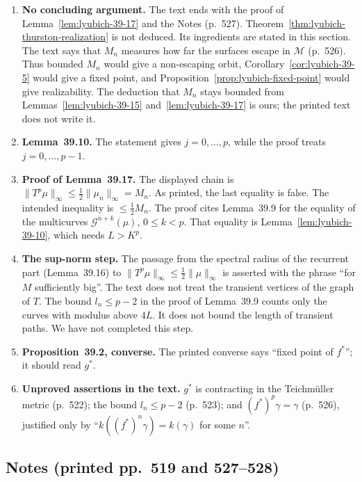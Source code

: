 \begin{enumerate}
\item \textbf{No concluding argument.}  The text ends with the proof of Lemma~\ref{lem:lyubich-39-17} and the
  Notes (p.~527).  Theorem~\ref{thm:lyubich-thurston-realization} is not deduced.  Its ingredients are stated
  in this section.  The text says that $M_n$ measures how far the surfaces escape in $\mathcal M$ (p.~526).  Thus
  bounded $M_n$ would give a non-escaping orbit, Corollary~\ref{cor:lyubich-39-5} would give a fixed point, and
  Proposition~\ref{prop:lyubich-fixed-point} would give realizability.  The deduction that $M_n$ stays bounded
  from Lemmas~\ref{lem:lyubich-39-15} and~\ref{lem:lyubich-39-17} is ours; the printed text does not write it.
\item \textbf{Lemma~39.10.}  The statement gives $j=0,\dots,p$, while the proof treats $j=0,\dots,p-1$.
\item \textbf{Proof of Lemma~39.17.}  The displayed chain is $\|T^p\mu\|_\infty\le\tfrac12\|\mu_n\|_\infty=M_n$.
  As printed, the last equality is false.  The intended inequality is $\le\tfrac12M_n$.  The proof cites
  Lemma~39.9 for the equality of the multicurves $\mathcal G^{n+k}(\mu)$, $0\le k<p$.  That equality is
  Lemma~\ref{lem:lyubich-39-10}, which needs $L>K^p$.
\item \textbf{The sup-norm step.}  The passage from the spectral radius of the recurrent part (Lemma~39.16) to
  $\|T^p\mu\|_\infty\le\tfrac12\|\mu\|_\infty$ is asserted with the phrase ``for $M$ sufficiently big''.  The text
  does not treat the transient vertices of the graph of $T$.  The bound $l_n\le p-2$ in the proof of
  Lemma~39.9 counts only the curves with modulus above $4L$.  It does not bound the length of transient paths.
  We have not completed this step.
\item \textbf{Proposition~39.2, converse.}  The printed converse says ``fixed point of $f^*$''; it should read $g^*$.
\item \textbf{Unproved assertions in the text.}  $g^*$ is contracting in the Teichm\"uller metric (p.~522); the
  bound $l_n\le p-2$ (p.~523); and $(f^*)^p\gamma=\gamma$ (p.~526), justified only by
  ``$k((f^*)^n\gamma)=k(\gamma)$ for some $n$''.
\end{enumerate}

\subsection*{Notes (printed pp.~519 and 527--528)}

